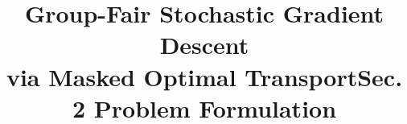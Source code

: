 \documentclass{article}
\title{Group-Fair Stochastic Gradient Descent \\ via Masked Optimal Transport}
\title{Sec. 2 Problem Formulation}
\theoremstyle{definition}
\begin{document}
\ninept\maketitle

\end{document}

